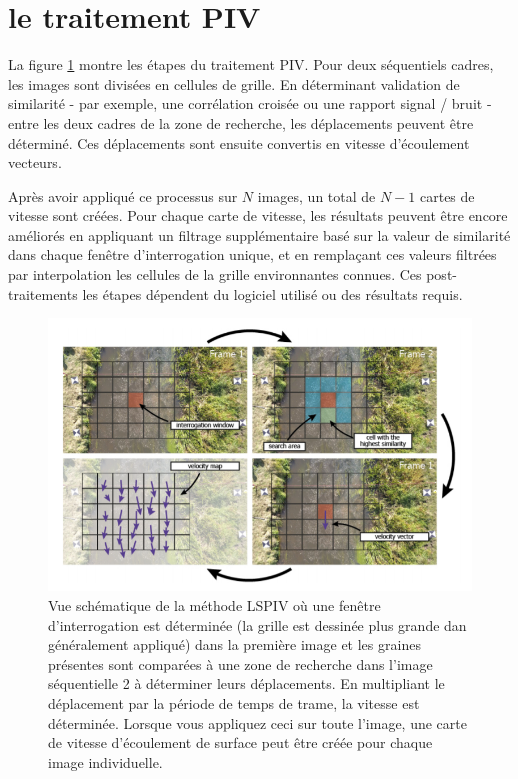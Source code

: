 \documentclass[
]{article}
\begin{document}
\hypertarget{piv}{%
\section*{le traitement PIV}\label{piv}}

La figure \ref{fig:fpivprocessing} montre les étapes du traitement PIV. Pour deux séquentiels cadres, les images sont divisées en cellules de grille. En déterminant validation de similarité - par exemple, une corrélation croisée ou une rapport signal / bruit \citetext{\citealp[ ]{ran_application_2016}; \citealp{osorio-cano_method_2013}} - entre les deux cadres de la zone de recherche, les déplacements peuvent être déterminé. Ces déplacements sont ensuite convertis en vitesse d'écoulement vecteurs.

Après avoir appliqué ce processus sur \(𝑁\) images, un total de \(𝑁− 1\) cartes de vitesse sont créées. Pour chaque carte de vitesse, les résultats peuvent être encore améliorés en appliquant un filtrage supplémentaire basé sur la valeur de similarité dans chaque fenêtre d'interrogation unique, et en remplaçant ces valeurs filtrées par interpolation les cellules de la grille environnantes connues. Ces post-traitements les étapes dépendent du logiciel utilisé ou des résultats requis.



\begin{figure}[H]
\includegraphics[width=1\linewidth,]{images/pivprocessing} \caption{Vue schématique de la méthode LSPIV où une fenêtre d'interrogation est déterminée (la grille est dessinée plus grande dan généralement appliqué) dans la première image et les graines présentes sont comparées à une zone de recherche dans l'image séquentielle 2 à déterminer leurs déplacements. En multipliant le déplacement par la période de temps de trame, la vitesse est déterminée. Lorsque vous appliquez ceci sur toute l'image, une carte de vitesse d'écoulement de surface peut être créée pour chaque image individuelle.}\label{fig:fpivprocessing}
\end{figure}
\end{document}
